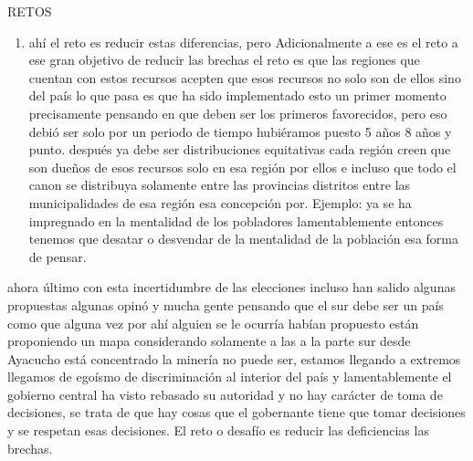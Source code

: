 \documentclass[
  letterpaper,
  DIV=11,
  numbers=noendperiod]{scrartcl}
\providecommand{\tightlist}{%
  \setlength{\itemsep}{0pt}\setlength{\parskip}{0pt}}\usepackage{longtable,booktabs,array}
\begin{document}
RETOS

\begin{enumerate}
\def\labelenumi{\arabic{enumi}.}
\setcounter{enumi}{2}
\tightlist
\item
  ahí el reto es reducir estas diferencias, pero Adicionalmente a ese es
  el reto a ese gran objetivo de reducir las brechas el reto es que las
  regiones que cuentan con estos recursos acepten que esos recursos no
  solo son de ellos sino del país lo que pasa es que ha sido
  implementado esto un primer momento precisamente pensando en que deben
  ser los primeros favorecidos, pero eso debió ser solo por un periodo
  de tiempo hubiéramos puesto 5 años 8 años y punto. después ya debe ser
  distribuciones equitativas cada región creen que son dueños de esos
  recursos solo en esa región por ellos e incluso que todo el canon se
  distribuya solamente entre las provincias distritos entre las
  municipalidades de esa región esa concepción por. Ejemplo: ya se ha
  impregnado en la mentalidad de los pobladores lamentablemente entonces
  tenemos que desatar o desvendar de la mentalidad de la población esa
  forma de pensar.
\end{enumerate}

ahora último con esta incertidumbre de las elecciones incluso han salido
algunas propuestas algunas opinó y mucha gente pensando que el sur debe
ser un país como que alguna vez por ahí alguien se le ocurría habían
propuesto están proponiendo un mapa considerando solamente a las a la
parte sur desde Ayacucho está concentrado la minería no puede ser,
estamos llegando a extremos llegamos de egoísmo de discriminación al
interior del país y lamentablemente el gobierno central ha visto
rebasado su autoridad y no hay carácter de toma de decisiones, se trata
de que hay cosas que el gobernante tiene que tomar decisiones y se
respetan esas decisiones. El reto o desafío es reducir las deficiencias
las brechas.
\end{document}
